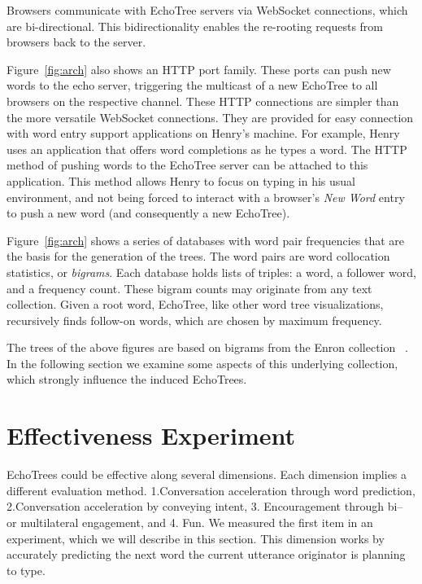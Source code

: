 \documentclass{sigchi}
\newcommand{\squishlist}{
 \begin{list}{$\bullet$}
 {
  \setlength{\itemsep}{0pt}
  \setlength{\parsep}{0pt}   %
  \setlength{\topsep}{0pt}   %
  \setlength{\partopsep}{0pt}
  \setlength{\leftmargin}{1.5em}
  \setlength{\labelwidth}{1em}
  \setlength{\labelsep}{0.5em} } }
\newcommand{\squishend}{
  \end{list}  }
\begin{document}
Browsers communicate with EchoTree servers via WebSocket connections,
which are bi-directional. This bidirectionality enables the re-rooting
requests from browsers back to the server.

Figure~\ref{fig:arch} also shows an HTTP port family. These ports can
push new words to the echo server, triggering the multicast of a new
EchoTree to all browsers on the respective channel. These HTTP
connections are simpler than the more versatile WebSocket
connections. They are provided for easy connection with word entry
support applications on Henry's machine. For example, Henry uses an
application that offers word completions as he types a word. The HTTP
method of pushing words to the EchoTree server can be attached to this
application. This method allows Henry to focus on typing in his usual
environment, and not being forced to interact with a browser's {\em
  New Word} entry to push a new word (and consequently a new
EchoTree).

Figure~\ref{fig:arch} shows a series of databases with word pair
frequencies that are the basis for the generation of the trees. The
word pairs are word collocation statistics, or {\em bigrams}.  Each
database holds lists of triples: a word, a follower word, and a
frequency count. These bigram counts may originate from any text
collection. Given a root word, EchoTree, like other word tree
visualizations, recursively finds follow-on words, which are chosen by
maximum frequency.

The trees of the above figures are based on bigrams from the Enron
collection ~\cite{enron}. In the following section we examine some
aspects of this underlying collection, which strongly influence the
induced EchoTrees.

\section{Effectiveness Experiment}
EchoTrees could be effective along several dimensions. Each dimension
implies a different evaluation method. 1.Conversation acceleration
through word prediction, 2.Conversation acceleration by conveying
intent, 3. Encouragement through bi-- or multilateral engagement, and
4. Fun.
We measured the first item in an experiment, which we will describe in
this section. This dimension works by accurately predicting the next
word the current utterance originator is planning to type.
\end{document}
